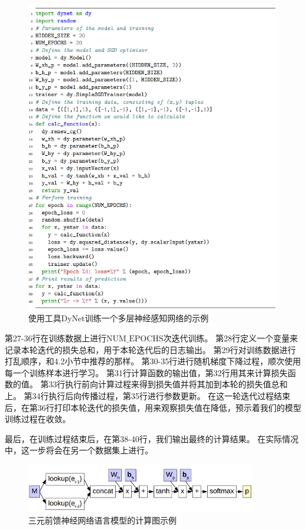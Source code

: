\documentclass[10pt,a4paper]{ctexart}
\begin{document}
\begin{figure}[H]
\centering
\includegraphics[width=1\textwidth]{fig11.png}
\caption{使用工具DyNet训练一个多层神经感知网络的示例}
\label{fig:11}
\end{figure}


第27-36行在训练数据上进行$\mathrm{NUM\_EPOCHS}$次迭代训练。
第28行定义一个变量来记录本轮迭代的损失总和，用于本轮迭代后的日志输出。
第29行对训练数据进行打乱顺序，和4.2小节中推荐的那样。
第30-35行进行随机梯度下降过程，顺次使用每一个训练样本进行学习。
第31行计算函数的输出值，第32行用其来计算损失函数的值。
第33行执行前向计算过程来得到损失值并将其加到本轮的损失值总和上。
第34行执行后向传播过程，第35行进行参数更新。
在这一轮迭代过程结束后，在第36行打印本轮迭代的损失值，用来观察损失值在降低，预示着我们的模型训练过程在收敛。

最后，在训练过程结束后，在第38-40行，我们输出最终的计算结果。
在实际情况中，这一步将会在另一个数据集上进行。

\begin{figure}[H]
\centering
\includegraphics[width=0.9\textwidth]{fig12.png}
\caption{三元前馈神经网络语言模型的计算图示例}
\label{fig:12}
\end{figure}
\end{document}
